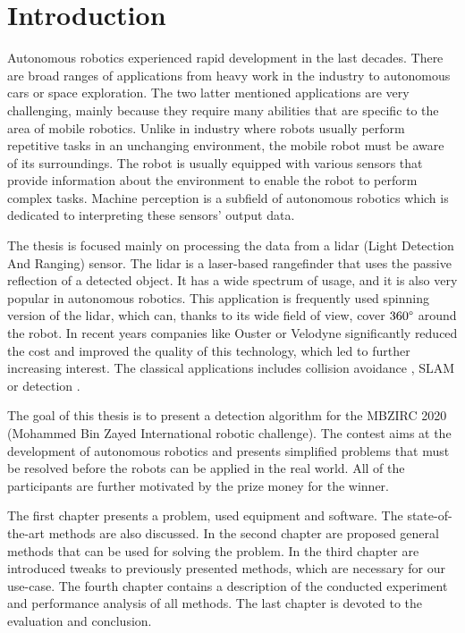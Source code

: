 \chapter{Introduction}
Autonomous robotics experienced rapid development in the last decades. There are broad ranges of applications from heavy work in the industry to autonomous cars or space exploration. The two latter mentioned applications are very challenging, mainly because they require many abilities that are specific to the area of mobile robotics. Unlike in industry where robots usually perform repetitive tasks in an unchanging environment, the mobile robot must be aware of its surroundings. The robot is usually equipped with various sensors that provide information about the environment to enable the robot to perform complex tasks. Machine perception is a subfield of autonomous robotics which is dedicated to interpreting these sensors' output data.

The thesis is focused mainly on processing the data from a lidar (Light Detection And Ranging) sensor. The lidar is a laser-based rangefinder that uses the passive reflection of a detected object. It has a wide spectrum of usage, and it is also very popular in autonomous robotics. This application is frequently used spinning version of the lidar, which can, thanks to its wide field of view, cover $360\degree$ around the robot. In recent years companies like Ouster or Velodyne significantly reduced the cost and improved the quality of this technology, which led to further increasing interest. The classical applications includes collision avoidance \cite{sabatini2007}, SLAM \cite{kohlbrecher2017} or detection \cite{himmelsbach2008}.

The goal of this thesis is to present a detection algorithm for the MBZIRC 2020 (Mohammed Bin Zayed International robotic challenge). The contest aims at the development of autonomous robotics and presents simplified problems that must be resolved before the robots can be applied in the real world. All of the participants are further motivated by the prize money for the winner.

The first chapter presents a problem, used equipment and software. The state-of-the-art methods are also discussed. In the second chapter are proposed general methods that can be used for solving the problem. In the third chapter are introduced tweaks to previously presented methods, which are necessary for our use-case. The fourth chapter contains a description of the conducted experiment and performance analysis of all methods. The last chapter is devoted to the evaluation and conclusion.

